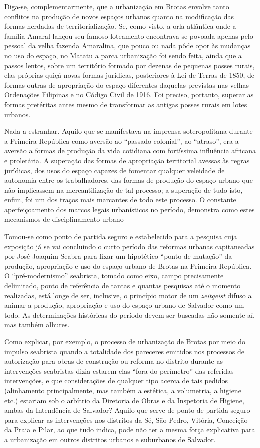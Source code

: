 Diga-se, complementarmente, que a urbanização em Brotas envolve tanto conflitos na produção de novos espaços urbanos quanto na modificação das formas herdadas de territorialização. Se, como visto, a orla atlântica onde a família Amaral lançou seu famoso loteamento encontrava-se povoada apenas pelo pessoal da velha fazenda Amaralina, que pouco ou nada pôde opor às mudanças no uso do espaço, no Matatu a parca urbanização foi sendo feita, ainda que a passos lentos, sobre um território formado por dezenas de pequenas posses rurais, elas próprias quiçá novas formas jurídicas, posteriores à Lei de Terras de 1850, de formas outras de apropriação do espaço diferentes daquelas previstas nas velhas Ordenações Filipinas e no Código Civil de 1916. Foi preciso, portanto, superar as formas pretéritas antes mesmo de transformar as antigas posses rurais em lotes urbanos.

Nada a estranhar. Aquilo que se manifestava na imprensa soteropolitana durante a Primeira República como aversão ao ``passado colonial'', ao ``atraso'', era a aversão a formas de produção da vida cotidiana com fortíssima influência africana e proletária. A superação das formas de apropriação territorial avessas às regras jurídicas, dos usos do espaço capazes de fomentar qualquer veleidade de autonomia entre os trabalhadores, das formas de produção do espaço urbano que não implicassem na mercantilização de tal processo; a superação de tudo isto, enfim, foi um dos traços mais marcantes de todo este processo. O constante aperfeiçoamento dos marcos legais urbanísticos no período, demonstra como estes mecanismos de disciplinamento urbano 

Tomou-se como ponto de partida seguro e estabelecido para a pesquisa cuja exposição já se vai concluindo o curto período das reformas urbanas capitaneadas por José Joaquim Seabra para fixar um hipotético ``ponto de mutação'' da produção, apropriação e uso do espaço urbano de Brotas na Primeira República. O ``pré-modernismo'' seabrista, tomado como eixo, campo precisamente delimitado, ponto de referência de tantas e quantas pesquisas até o momento realizadas, está longe de ser, inclusive, o princípio motor de um \textit{zeitgeist} difuso a animar a produção, apropriação e uso do espaço urbano de Salvador como um todo. As determinações históricas do período devem ser buscadas não somente aí, mas também alhures.

Como explicar, por exemplo, o processo de urbanização de Brotas por meio do impulso seabrista quando a totalidade dos pareceres emitidos nos processos de autorização para obras de construção ou reforma no distrito durante as intervenções seabristas dizia estarem elas ``fora do perímetro'' das referidas intervenções, e que considerações de qualquer tipo acerca de tais pedidos (alinhamento principalmente, mas também a estética, a volumetria, a higiene etc.) estariam sob o arbítrio da Diretoria de Obras e da Inspetoria de Higiene, ambas da Intendência de Salvador? Aquilo que serve de ponto de partida seguro para explicar as intervenções nos distritos da Sé, São Pedro, Vitória, Conceição da Praia e Pilar, ao que tudo indica, pode não ter a mesma força explicativa para a urbanização em outros distritos urbanos e suburbanos de Salvador.

